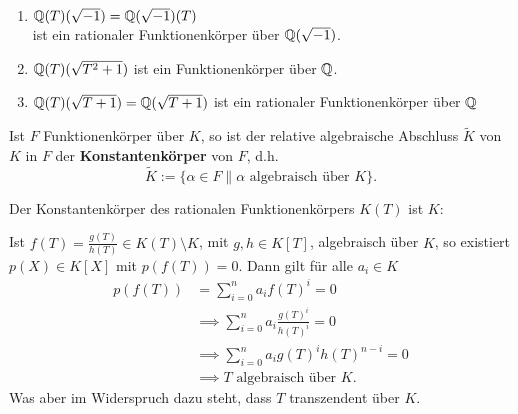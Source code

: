 \begin{beispiel}
    \begin{enumerate}[label=\alph*)]
        \item $\mathbb{Q}(T)(\sqrt{-1}) = \mathbb{Q}(\sqrt{-1})(T)$\\
        ist ein rationaler Funktionenkörper über $\mathbb{Q}(\sqrt{-1})$. 
        
        \item $\mathbb{Q}(T)(\sqrt{T^2+1})$ ist ein Funktionenkörper über $\mathbb{Q}$.

        \item $\mathbb{Q}(T)(\sqrt{T+1}) = \mathbb{Q}(\sqrt{T+1})$ ist ein rationaler Funktionenkörper über $\mathbb{Q}$ 
    \end{enumerate}
\end{beispiel}

\begin{definition}
    Ist $F$ Funktionenkörper über $K$, 
    so ist der relative algebraische Abschluss $\tilde{K}$ von $K$ in $F$ der 
    \textbf{Konstantenkörper} von $F$, d.h.
    $$ \tilde{K} := \{\alpha \in F \| \alpha \text{ algebraisch  über } K\}.$$
\end{definition}

\begin{beispiel}
    Der Konstantenkörper des rationalen Funktionenkörpers $K(T)$ ist $K$:

    Ist $f(T) = \frac{g(T)}{h(T)} \in K(T) \setminus K$, mit $g,h \in K[T]$, algebraisch über $K$,
    so existiert $p(X) \in K[X]$ mit $p(f(T)) = 0$. Dann gilt für alle $a_i \in K$
    \begin{align*}
        p(f(T)) &= \sum\limits_{i=0}^n a_i f(T)^i = 0\\
        & \implies \sum\limits_{i=0}^n a_i \frac{g(T)^i}{h(T)^i} = 0\\
        & \implies \sum\limits_{i=0}^n a_i g(T)^i h(T)^{n-i} = 0 \\
        & \implies T \text{ algebraisch über } K.
    \end{align*}
    Was aber im Widerspruch dazu steht, dass $T$ transzendent über $K$.
\end{beispiel}

